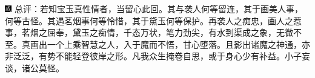 {\includegraphics[width=3mm]{../Images/00005}  \kaishu 总评：若知宝玉真性情者，当留心此回。其与袭人何等留连，其于画美人事，何等古怪。其遇茗烟事何等怜惜，其于黛玉何等保护。再袭人之痴忠，画人之惹事，茗烟之屈奉，黛玉之痴情，千态万状，笔力劲尖，有水到渠成之象，无微不至。真画出一个上乘智慧之人，入于魔而不悟，甘心堕落。且影出诸魔之神通，亦非泛泛，有势不能轻登彼岸之形。凡我众生掩卷自思，或于身心少有补益。小子妄谈，诸公莫怪。}




%
%
%
%
%
